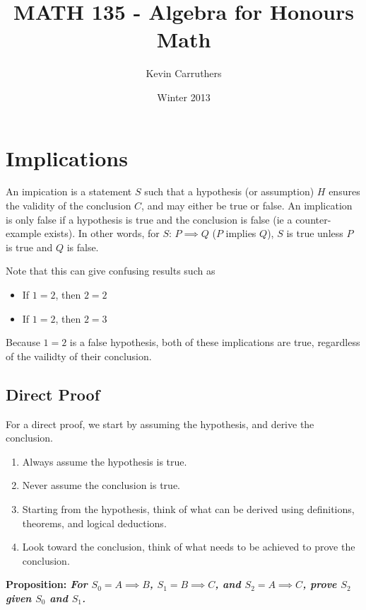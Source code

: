 \documentclass[12pt]{article}
\newcommand{\proposition}[1]{{\bf Proposition: \textit{#1}}}
\begin{document}
\title{MATH 135 - Algebra for Honours Math}
\author{Kevin Carruthers}
\date{\vspace{-2ex}Winter 2013}
\maketitle\HRule

\section*{Implications}
 An impication is a statement $S$ such that a hypothesis (or assumption) $H$ ensures the validity of the conclusion $C$, and may either be true or false. An implication is only false if a hypothesis is true and the conclusion is false (ie a counter-example exists). In other words, for $S$: $P \implies Q$ ($P$ implies $Q$), $S$ is true unless $P$ is true and $Q$ is false.

Note that this can give confusing results such as
\begin{itemize}
\item If $1 = 2$, then $2 = 2$
\item If $1 = 2$, then $2 = 3$
\end{itemize}
Because $1 = 2$ is a false hypothesis, both of these implications are true, regardless of the vailidty of their conclusion.

\subsection*{Direct Proof}
For a direct proof, we start by assuming the hypothesis, and derive the conclusion.

\begin{enumerate}
\item Always assume the hypothesis is true.
\item Never assume the conclusion is true.
\item Starting from the hypothesis, think of what can be derived using definitions, theorems, and logical deductions.
\item Look toward the conclusion, think of what needs to be achieved to prove the conclusion.
\end{enumerate}

\proposition{For $S_0 = A \implies B$, $S_1 = B \implies C$, and $S_2 = A \implies C$, prove $S_2$ given $S_0$ and $S_1$.}

\end{document}
